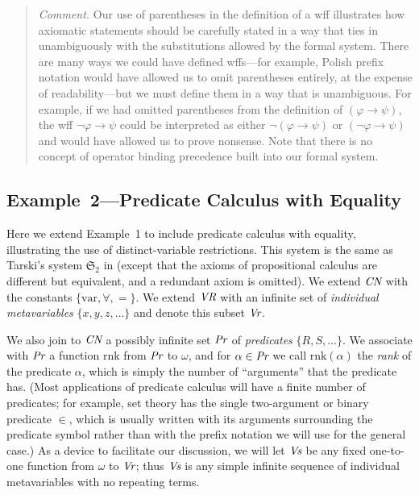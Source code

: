 {\footnotesize\begin{quotation}
{\em Comment.} Our use of parentheses in the definition of a wff illustrates
how axiomatic statements should be carefully stated in a way that
ties in unambiguously with the substitutions allowed by the formal system.
There are many ways we could have defined wffs---for example, Polish
prefix notation would have allowed us to omit parentheses entirely, at
the expense of readability---but we must define them in a way that is
unambiguous.  For example, if we had omitted parentheses from the
definition of $(\varphi\to \psi)$, the wff $\lnot\varphi\to \psi$ could
be interpreted as either $\lnot(\varphi\to\psi)$ or $(\lnot\varphi\to\psi)$
and would have allowed us to prove nonsense.  Note that there is no
concept of operator binding precedence built into our formal system.
\end{quotation}}

\begin{sloppy}
\subsection{Example~2---Predicate Calculus with Equality}
\end{sloppy}

Here we extend Example~1 to include predicate calculus with equality,
illustrating the use of distinct-variable restrictions.  This system is the
same as Tarski's system $\mathfrak{S}_2$ in \cite{Tarski1965} (except that the
axioms of propositional calculus are different but equivalent, and a redundant
axiom is omitted).  We extend $\mbox{\em CN}$ with the constants
$\{\mbox{var},\forall,=\}$.  We extend $\mbox{\em VR}$ with an infinite set of
{\em individual metavariables} $\{x,y,z,\ldots\}$ and denote this subset
$\mbox{\em Vr}$.

We also join to $\mbox{\em CN}$ a possibly infinite set $\mbox{\em Pr}$ of {\em
predicates} $\{R,S,\ldots\}$.  We associate with $\mbox{\em Pr}$ a function
$\mbox{rnk}$ from $\mbox{\em Pr}$ to $\omega$, and for $\alpha\in \mbox{\em
Pr}$ we call $\mbox{rnk}(\alpha)$ the {\em rank} of the predicate $\alpha$,
which is simply the number of ``arguments'' that the predicate has.  (Most
applications of predicate calculus will have a finite number of predicates;
for example, set theory has the single two-argument or binary predicate $\in$,
which is usually written with its arguments surrounding the predicate symbol
rather than with the prefix notation we will use for the general case.)  As a
device to facilitate our discussion, we will let $\mbox{\em Vs}$ be any fixed
one-to-one function from $\omega$ to $\mbox{\em Vr}$; thus $\mbox{\em Vs}$ is
any simple infinite sequence of individual metavariables with no repeating
terms.

